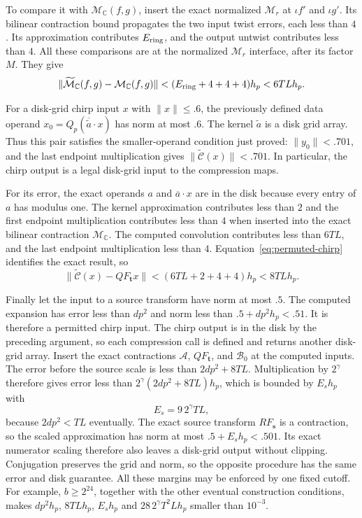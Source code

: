 \documentclass[11pt]{article}
\theoremstyle{definition}
\begin{document}
To compare it with $\mathcal M_{\mathbb C}(f,g)$, insert the exact
normalized $\mathcal M_r$ at $\iota f'$ and $\iota g'$.
Its bilinear contraction bound propagates the two input twist errors,
each less than $4$.  Its approximation contributes $E_{\rm ring}$,
and the output untwist contributes less than $4$.  All these
comparisons are at the normalized $\mathcal M_r$ interface, after its
factor $M$.  They give
\[
 \|\widetilde{\mathcal M}_{\mathbb C}(f,g)
            -\mathcal M_{\mathbb C}(f,g)\|
 <(E_{\rm ring}+4+4+4)h_p<6TLh_p.
\]

For a disk-grid chirp input $x$ with $\|x\|\le.6$, the previously
defined data operand $x_0=Q_p(\overline{\widetilde a}\cdot x)$ has
norm at most $.6$.  The kernel $\widetilde a$ is a disk grid array.
Thus this pair satisfies the smaller-operand condition just proved:
$\|y_0\|<.701$, and the last endpoint multiplication gives
$\|\widetilde{\mathscr C}(x)\|<.701$.  In particular, the chirp output
is a legal disk-grid input to the compression maps.

For its error, the exact operands $a$ and $\overline a\cdot x$ are in
the disk because every entry of $a$ has modulus one.  The kernel
approximation contributes less than $2$ and
the first endpoint multiplication contributes less than $4$ when
inserted into the exact bilinear contraction
$\mathcal M_{\mathbb C}$.  The computed convolution contributes less
than $6TL$, and the last endpoint multiplication less than $4$.
Equation~\eqref{eq:permuted-chirp} identifies the exact result, so
\[
 \|\widetilde{\mathscr C}(x)-QF_{\boldsymbol t}x\|
 <(6TL+2+4+4)h_p<8TLh_p.
\]

Finally let the input to a source transform have norm at most $.5$.
The computed expansion has error less than $dp^2$ and norm less than
$.5+dp^2h_p<.51$.  It is therefore a permitted chirp input.  The
chirp output is in the disk by the preceding argument, so each
compression call is defined and returns another disk-grid array.
Insert the exact contractions $\mathcal A$, $QF_{\boldsymbol t}$,
and $\mathcal B_0$ at the computed inputs.  The error before the
source scale is less than $2dp^2+8TL$.  Multiplication by
$2^\gamma$ therefore gives error less than
$2^\gamma(2dp^2+8TL)h_p$, which is bounded by $E_sh_p$ with
\begin{equation}\label{eq:source-error}
 E_s=9\,2^\gamma TL,
\end{equation}
because $2dp^2<TL$ eventually.  The exact source transform
$RF_{\boldsymbol s}$ is a contraction, so the scaled approximation
has norm at most $.5+E_sh_p<.501$.  Its exact numerator scaling
therefore also leaves a disk-grid output without clipping.
Conjugation preserves the grid and norm, so the opposite procedure
has the same error and disk guarantee.
All these margins may be enforced by one fixed cutoff.  For example,
$b\ge2^{24}$, together with the other eventual construction conditions,
makes $dp^2h_p$, $8TLh_p$, $E_sh_p$ and
$28\,2^\gamma T^2Lh_p$ smaller than $10^{-3}$.
\end{document}

